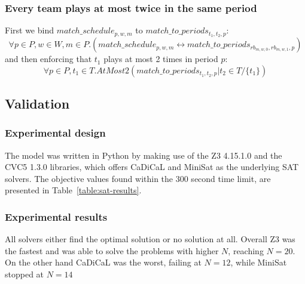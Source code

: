 \subsubsection{Every team plays at most twice in the same period}
First we bind $match\_schedule_{p, w, m}$ to $match\_to\_periods_{t_1, t_2, p}$:
$$
    \forall p \in P, w \in W, m \in P.(match\_schedule_{p, w, m} \leftrightarrow match\_to\_periods_{rb_{m, w, 0}, rb_{m, w, 1}, p})
$$
and then enforcing that $t_1$ plays at most 2 times in period $p$:
$$
    \forall p \in P, t_1 \in T. AtMost2(match\_to\_periods_{t_1, t_2, p} | t_2 \in T/\{t_1\})
$$
\subsection{Validation}
\subsubsection{Experimental design}
The model was written in Python by making use of the Z3 4.15.1.0 and the CVC5 1.3.0 libraries, which offers CaDiCaL and MiniSat as the underlying SAT solvers.
The objective values found within the 300 second time limit, are presented in Table~\ref{table:sat-results}. 
\subsubsection{Experimental results}
All solvers either find the optimal solution or no solution at all. Overall Z3 was the fastest and was able to solve the problems with higher $N$, reaching $N=20$. On the other hand CaDiCaL was the worst, failing at $N=12$, while MiniSat stopped at $N=14$

